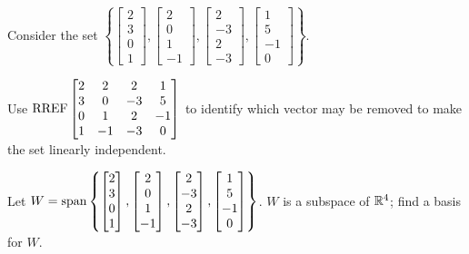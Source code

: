 \begin{applicationActivities}
\begin{activity}{10}
  Consider the set \(\left\{
  \begin{bmatrix}2\\3\\0\\1\end{bmatrix},
  \begin{bmatrix}2\\0\\1\\-1\end{bmatrix},
  \begin{bmatrix}2\\-3\\2\\-3\end{bmatrix},
  \begin{bmatrix}1\\5\\-1\\0\end{bmatrix}
  \right\}
  \).

  \begin{subactivity}
    Use \(\operatorname{RREF}\begin{bmatrix}
    2&2&2&1\\
    3&0&-3&5\\
    0&1&2&-1\\
    1&-1&-3&0
    \end{bmatrix}\) to identify which vector may be removed to make the set
    linearly independent.
  \end{subactivity}

  \begin{subactivity}
     Let \(W=\operatorname{span}\left\{
    \begin{bmatrix}2\\3\\0\\1\end{bmatrix},
    \begin{bmatrix}2\\0\\1\\-1\end{bmatrix},
    \begin{bmatrix}2\\-3\\2\\-3\end{bmatrix},
    \begin{bmatrix}1\\5\\-1\\0\end{bmatrix}
    \right\}
    \).  \(W\) is a subspace of \(\mathbb{R}^4\); find a basis for \(W\).
  \end{subactivity}
\end{activity}


\end{applicationActivities}
